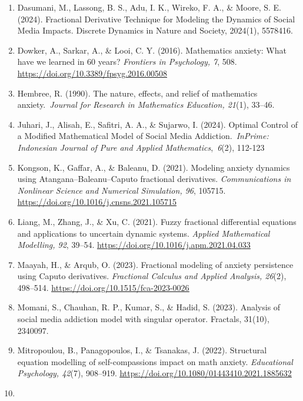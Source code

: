 \documentclass[
]{article}
\begin{document}
\begin{enumerate}
\item
  Dasumani, M., Lassong, B. S., Adu, I. K., Wireko, F. A., \& Moore, S. E. (2024). Fractional Derivative Technique for Modeling the Dynamics of Social Media Impacts. Discrete Dynamics in Nature and Society, 2024(1), 5578416.
\item
  Dowker, A., Sarkar, A., \& Looi, C. Y. (2016). Mathematics anxiety: What have we learned in 60 years? \emph{Frontiers in Psychology, 7}, 508. \href{https://doi.org/10.3389/fpsyg.2016.00508}{\ul{https://doi.org/10.3389/fpsyg.2016.00508}}
\item
  Hembree, R. (1990). The nature, effects, and relief of mathematics anxiety.~\emph{Journal for Research in Mathematics Education, 21}(1), 33--46.
\item
  Juhari, J., Alisah, E., Safitri, A. A., \& Sujarwo, I. (2024). Optimal Control of a Modified Mathematical Model of Social Media Addiction.~\emph{InPrime: Indonesian Journal of Pure and Applied Mathematics},~\emph{6}(2), 112-123
\item
  Kongson, K., Gaffar, A., \& Baleanu, D. (2021). Modeling anxiety dynamics using Atangana--Baleanu--Caputo fractional derivatives. \emph{Communications in Nonlinear Science and Numerical Simulation, 96}, 105715. \href{https://doi.org/10.1016/j.cnsns.2021.105715}{\ul{https://doi.org/10.1016/j.cnsns.2021.105715}}
\item
  Liang, M., Zhang, J., \& Xu, C. (2021). Fuzzy fractional differential equations and applications to uncertain dynamic systems. \emph{Applied Mathematical Modelling, 92}, 39--54. \href{https://doi.org/10.1016/j.apm.2021.04.033}{\ul{https://doi.org/10.1016/j.apm.2021.04.033}}
\item
  Maayah, H., \& Arqub, O. (2023). Fractional modeling of anxiety persistence using Caputo derivatives. \emph{Fractional Calculus and Applied Analysis, 26}(2), 498--514. \href{https://doi.org/10.1515/fca-2023-0026}{\ul{https://doi.org/10.1515/fca-2023-0026}}
\item
  Momani, S., Chauhan, R. P., Kumar, S., \& Hadid, S. (2023). Analysis of social media addiction model with singular operator. Fractals, 31(10), 2340097.
\item
  Mitropoulou, B., Panagopoulos, I., \& Tsanakas, J. (2022). Structural equation modelling of self-compassion\textquotesingle s impact on math anxiety. \emph{Educational Psychology, 42}(7), 908--919. \href{https://doi.org/10.1080/01443410.2021.1885632}{\ul{https://doi.org/10.1080/01443410.2021.1885632}}
\item

\end{enumerate}
\end{document}
